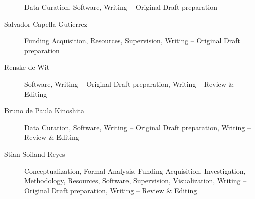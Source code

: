 \documentclass[10pt,letterpaper]{article}
\providecommand{\DIFaddbegin}{} %
\providecommand{\DIFaddend}{} %
\newcommand{\DIFaddincludegraphics}[2][]{{\color{blue}\fbox{\DIFOincludegraphics[#1]{#2}}}} %
\DeclareRobustCommand{\DIFaddbegin}{\DIFOaddbegin \let\includegraphics\DIFaddincludegraphics} %
\DeclareRobustCommand{\DIFaddend}{\DIFOaddend \let\includegraphics\DIFOincludegraphics} %
\begin{document}
\begin{description}
Data Curation, Software, Writing -- Original Draft preparation
\item[Salvador Capella-Gutierrez]
Funding Acquisition, Resources, Supervision, Writing -- Original Draft preparation
\item[Renske de Wit]
Software, Writing -- Original Draft preparation, Writing -- Review \& Editing
\item[Bruno de Paula Kinoshita]
Data Curation, Software, Writing -- Original Draft preparation, Writing -- Review \& Editing
\item[Stian Soiland-Reyes]
Conceptualization, Formal Analysis, Funding Acquisition, Investigation, Methodology, Resources, Software, Supervision, Visualization, Writing -- Original Draft preparation, Writing -- Review \& Editing
\end{description}
\DIFaddbegin \fi
\DIFaddend 

\nolinenumbers
\end{document}
